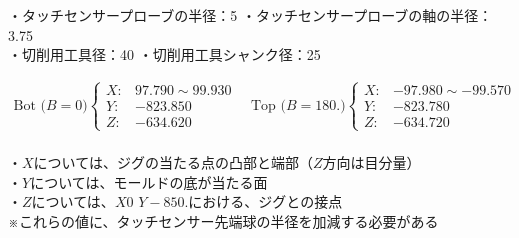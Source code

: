 \begin{tcolorbox}[title={内面溝加工に関する工具(T31, T50)の情報}, fonttitle=\gtfamily\bfseries]
・タッチセンサープローブの半径：5 \quad ・タッチセンサープローブの軸の半径：3.75\\
・切削用工具径：40 \quad ・切削用工具シャンク径：25
\end{tcolorbox}
\begin{tcolorbox}[title={2023/07/28時点の\MMname 実測値}, fonttitle=\gtfamily\bfseries]
\begin{align*}
  \text{Bot ($B=0$)}
  \left\{
  \begin{array}{rl}
    X: & 97.790 \sim 99.930\\
    Y: & -823.850\\
    Z: & -634.620
  \end{array}
  \right.\quad
  \text{Top ($B=180.$)}
  \left\{
  \begin{array}{rl}
    X: & -97.980 \sim -99.570\\
    Y: & -823.780\\
    Z: & -634.720
  \end{array}
  \right.
\end{align*}\\
・$X$については、ジグの当たる点の凸部と端部（$Z$方向は目分量）\\
・$Y$については、モールドの底が当たる面\\
・$Z$については、$X0$ $Y-850.$における、ジグとの接点\\
※これらの値に、タッチセンサー先端球の半径を加減する必要がある
\end{tcolorbox}






